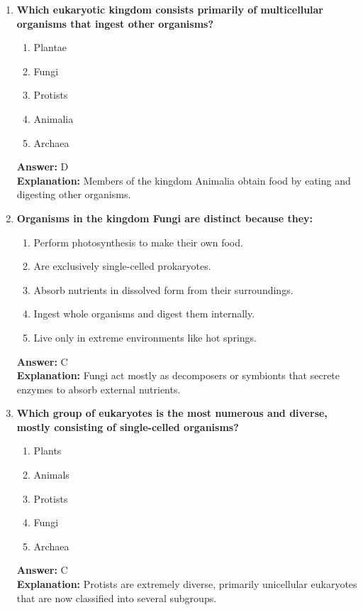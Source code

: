 \documentclass[11pt, a4paper]{article}
\begin{document}
\begin{enumerate}
\item \textbf{Which eukaryotic kingdom consists primarily of multicellular organisms that ingest other organisms?}
\begin{enumerate}[label=\Alph*.]
    \item Plantae
    \item Fungi
    \item Protists
    \item Animalia
    \item Archaea
\end{enumerate}
\textbf{Answer:} D \\
\textbf{Explanation:} Members of the kingdom Animalia obtain food by eating and digesting other organisms.

\item \textbf{Organisms in the kingdom Fungi are distinct because they:}
\begin{enumerate}[label=\Alph*.]
    \item Perform photosynthesis to make their own food.
    \item Are exclusively single-celled prokaryotes.
    \item Absorb nutrients in dissolved form from their surroundings.
    \item Ingest whole organisms and digest them internally.
    \item Live only in extreme environments like hot springs.
\end{enumerate}
\textbf{Answer:} C \\
\textbf{Explanation:} Fungi act mostly as decomposers or symbionts that secrete enzymes to absorb external nutrients.

\item \textbf{Which group of eukaryotes is the most numerous and diverse, mostly consisting of single-celled organisms?}
\begin{enumerate}[label=\Alph*.]
    \item Plants
    \item Animals
    \item Protists
    \item Fungi
    \item Archaea
\end{enumerate}
\textbf{Answer:} C \\
\textbf{Explanation:} Protists are extremely diverse, primarily unicellular eukaryotes that are now classified into several subgroups.


\end{enumerate}
\end{document}

